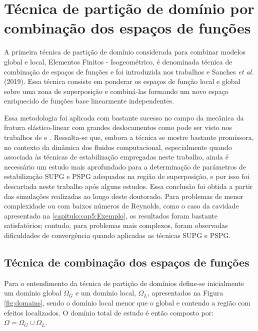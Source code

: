\chapter[Técnica de partição de domínio por combinação dos espaços de funções]{Técnica de partição de domínio por combinação dos espaços de funções} \label{capitulo:Cap5}

A primeira técnica de partição de domínio considerada para combinar modelos global e local, Elementos Finitos - Isogeométrico, é denominada técnica de combinação de espaços de funções e foi introduzida nos trabalhos  e Sanches \textit{et al.} (2019). Essa técnica consiste em ponderar os espaços de função local e global sobre uma zona de superposição e combiná-las formando um novo espaço enriquecido de funções base linearmente independentes. 

Essa metodologia foi aplicada com bastante sucesso no campo da mecânica da fratura elástico-linear com grandes deslocamentos como pode ser visto nos trabalhos de  e . Ressalta-se que, embora a técnica se mostre bastante promissora, no contexto da dinâmica dos fluidos computacional, especialmente quando associada às técnicas de estabilização empregadas neste trabalho, ainda é necessário um estudo mais aprofundado para a determinação de parâmetros de estabilização SUPG e PSPG adequados na região de superposição, e por isso foi descartada neste trabalho após alguns estudos. Essa conclusão foi obtida a partir das simulações realizadas ao longo deste doutorado. Para problemas de menor complexidade ou com baixos números de Reynolds, como o caso da cavidade apresentado na \autoref{capitulo:cap5:Exemplo}, os resultados foram bastante satisfatórios; contudo, para problemas mais complexos, foram observadas dificuldades de convergência quando aplicadas as técnicas SUPG e PSPG.

\section{Técnica de combinação dos espaços de funções}

Para o entendimento da técnica de partição de domínios define-se inicialmente um domínio global $\Omega_G$ e um domínio local, $\Omega_L$, apresentados na Figura \ref{fig:domains}, sendo o domínio local menor que o global e contendo a região com efeitos localizados. O domínio total de estudo é então composto por: $\Omega = \Omega_G \cup \Omega_L$.

